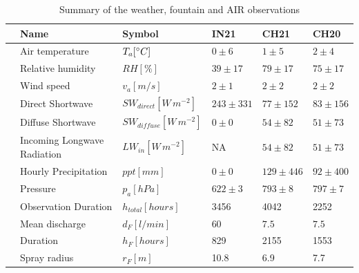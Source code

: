 \documentclass[utf8]{frontiersSCNS} %
\begin{document}
\begin{table}
	\centering
	\caption{ Summary of the weather, fountain and AIR observations}
	\label{tab:Observations}
	\begin{tabular}{@{}|llllll|@{}}
		\toprule
		\textbf{}              & \textbf{Name}               & \textbf{Symbol}           & \textbf{IN21} & \textbf{CH21} & \textbf{CH20} \\ \midrule
		\multicolumn{1}{|l|}{\multirow{9}{*}{\rotatebox[origin=c]{90}{Weather}}}
		                       & Air temperature             & $T_a [\degree C]    $     & $0 \pm 6$     & $1 \pm 5$     & $2 \pm 4$     \\
		\multicolumn{1}{|l|}{} & Relative humidity           & $RH  [\%]        $        & $39 \pm 17$   & $79 \pm 17$   & $75 \pm 17$   \\
		\multicolumn{1}{|l|}{} & Wind speed                  & $v_a [m/s]        $       & $2 \pm 1$     & $2 \pm 2$     & $2 \pm 2$     \\
		\multicolumn{1}{|l|}{} & Direct Shortwave            & $SW_{direct} [W\,m^{-2}]$ & $243 \pm 331$ & $77 \pm 152$  & $83 \pm 156$  \\
		\multicolumn{1}{|l|}{} & Diffuse Shortwave           & $SW_{diffuse}[W\,m^{-2}]$ & $0 \pm 0$     & $54 \pm82$    & $51 \pm 73$   \\
		\multicolumn{1}{|l|}{} & Incoming Longwave Radiation & $LW_{in}[W\,m^{-2}]$      & NA            & $54 \pm82$    & $51 \pm 73$   \\
		\multicolumn{1}{|l|}{} & Hourly Precipitation        & $ppt [mm]       $         & $0 \pm 0$     & $129 \pm 446$ & $92 \pm 400$  \\
		\multicolumn{1}{|l|}{} & Pressure                    & $p_a [hPa]        $       & $622 \pm 3$   & $793 \pm 8$   & $797 \pm7$    \\
    \multicolumn{1}{|l|}{} & Observation Duration        & $h_{total} [hours]$       & 3456          & 4042        & 2252         \\\bottomrule
		\multicolumn{1}{|l|}{\multirow{4}{*}{\rotatebox[origin=c]{90}{Fountain}}}
		                       & Mean discharge              & $d_F [l/min]     $        & $60$          & $7.5$         & $7.5$         \\
		\multicolumn{1}{|l|}{} & Duration                    & $h_F [hours]$                 & 829           & 2155          & 1553          \\
		\multicolumn{1}{|l|}{} & Spray radius                & $r_{F} [m]$               & 10.8          & 6.9           & 7.7           \\

\end{tabular}
\end{table}
\end{document}
